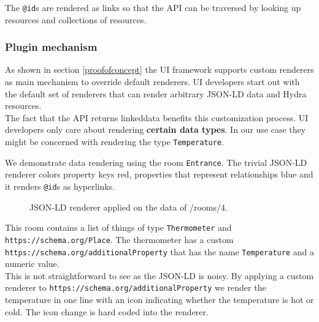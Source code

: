 The \lstinline{@id}s are rendered as links so that the API can be traversed by looking up resources and collections of resources.

\subsubsection{Plugin mechanism}\label{pluginmechanism}
As shown in section \ref{proofofconcept} the UI framework supports custom renderers as main mechanism to override default renderers. UI developers start out with the default set of renderers that can render arbitrary JSON-LD data and Hydra resources. \\
The fact that the API returns \gls{linkeddata} benefits this customization process. UI developers only care about rendering \textbf{certain data types}. In our use case they might be concerned with rendering the type \lstinline{Temperature}.

We demonstrate data rendering using the room \lstinline{Entrance}. The trivial JSON-LD renderer colors property keys red, properties that represent relationships blue and it renders \lstinline{@id}s as hyperlinks.

\begin{figure}[!htb]
  \caption{JSON-LD renderer applied on the data of /rooms/4.}
\end{figure}

This room contains a list of things of type \lstinline{Thermometer} and \lstinline{https://schema.org/Place}. The thermometer has a custom \lstinline{https://schema.org/additionalProperty} that has the name \lstinline{Temperature} and a numeric value. \\
This is not straightforward to see as the JSON-LD is noisy. By applying a custom renderer to \lstinline{https://schema.org/additionalProperty} we render the temperature in one line with an icon indicating whether the temperature is hot or cold. The icon change is hard coded into the renderer.

